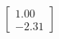 \documentclass[preview]{standalone}
\begin{document}
\begin{align*}
\begin{bmatrix} 1.00 \\ -2.31 \end{bmatrix}
\end{align*}
\end{document}
